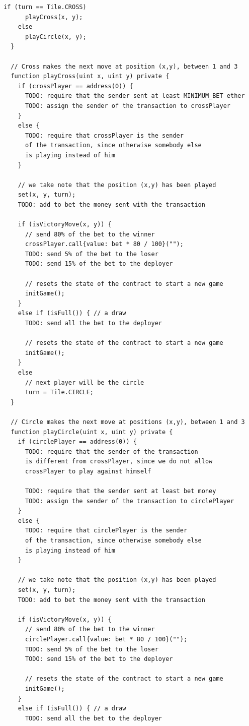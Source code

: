 \documentclass{article}
\begin{document}
\begin{lstlisting}[language=Solidity,numbers=none]
    if (turn == Tile.CROSS)
      playCross(x, y);
    else
      playCircle(x, y);
  }

  // Cross makes the next move at position (x,y), between 1 and 3
  function playCross(uint x, uint y) private {
    if (crossPlayer == address(0)) {
      TODO: require that the sender sent at least MINIMUM_BET ether
      TODO: assign the sender of the transaction to crossPlayer
    }
    else {
      TODO: require that crossPlayer is the sender
      of the transaction, since otherwise somebody else
      is playing instead of him
    }

    // we take note that the position (x,y) has been played
    set(x, y, turn);
    TODO: add to bet the money sent with the transaction

    if (isVictoryMove(x, y)) {
      // send 80% of the bet to the winner
      crossPlayer.call{value: bet * 80 / 100}("");
      TODO: send 5% of the bet to the loser
      TODO: send 15% of the bet to the deployer

      // resets the state of the contract to start a new game
      initGame();
    }
    else if (isFull()) { // a draw
      TODO: send all the bet to the deployer

      // resets the state of the contract to start a new game
      initGame();
    }
    else
      // next player will be the circle
      turn = Tile.CIRCLE;
  }

  // Circle makes the next move at positions (x,y), between 1 and 3
  function playCircle(uint x, uint y) private {
    if (circlePlayer == address(0)) {
      TODO: require that the sender of the transaction
      is different from crossPlayer, since we do not allow
      crossPlayer to play against himself

      TODO: require that the sender sent at least bet money
      TODO: assign the sender of the transaction to circlePlayer
    }
    else {
      TODO: require that circlePlayer is the sender
      of the transaction, since otherwise somebody else
      is playing instead of him
    }

    // we take note that the position (x,y) has been played
    set(x, y, turn);
    TODO: add to bet the money sent with the transaction

    if (isVictoryMove(x, y)) {
      // send 80% of the bet to the winner
      circlePlayer.call{value: bet * 80 / 100}("");
      TODO: send 5% of the bet to the loser
      TODO: send 15% of the bet to the deployer

      // resets the state of the contract to start a new game
      initGame();
    }
    else if (isFull()) { // a draw
      TODO: send all the bet to the deployer


\end{lstlisting}
\end{document}
